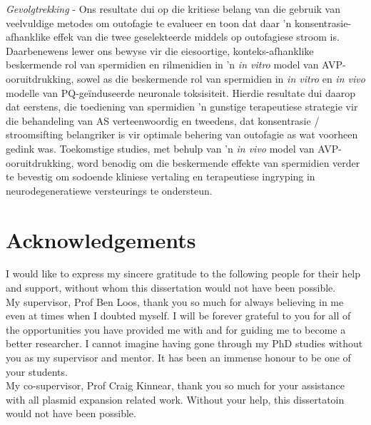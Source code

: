 \textit{Gevolgtrekking} - Ons resultate dui op die kritiese belang van die gebruik van veelvuldige metodes om outofagie te evalueer en toon dat daar 'n konsentrasie-afhanklike effek van die twee geselekteerde middels op outofagiese stroom is. Daarbenewens lewer ons bewyse vir die eiesoortige, konteks-afhanklike beskermende rol van spermidien en rilmenidien in 'n \textit{in vitro} model van AVP-ooruitdrukking, sowel as die beskermende rol van spermidien in \textit{in vitro} en \textit{in vivo} modelle van PQ-ge{\"i}nduseerde neuronale toksisiteit. Hierdie resultate dui daarop dat eerstens, die toediening van spermidien 'n gunstige terapeutiese strategie vir die behandeling van AS verteenwoordig en tweedens, dat konsentrasie / stroomsifting belangriker is vir optimale behering van outofagie as wat voorheen gedink was. Toekomstige studies, met behulp van 'n \textit{in vivo} model van AVP-ooruitdrukking, word benodig om die beskermende effekte van spermidien verder te bevestig om sodoende kliniese vertaling en terapeutiese ingryping in neurodegeneratiewe versteurings te ondersteun.

\chapter{Acknowledgements}

\noindent
I would like to express my sincere gratitude to the following people for their help and support, without whom this dissertation would not
have been possible. \\

\noindent
My supervisor, Prof Ben Loos, thank you so much for always believing in me even at times when I doubted myself. I will be forever grateful to you for all of the opportunities you have provided me with and for guiding me to become a better researcher. I cannot imagine having gone through my PhD studies without you as my supervisor and mentor. It has been an immense honour to be one of your students. \\

\noindent
My co-supervisor, Prof Craig Kinnear, thank you so much for your assistance with all plasmid expansion related work. Without your help, this dissertatoin would not have been possible.\\

